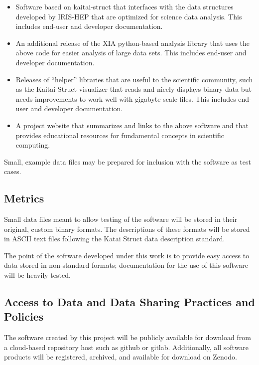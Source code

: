 \documentclass[11pt,oneside]{memoir}
\begin{document}
\begin{itemize}
    \item Software based on kaitai-struct that interfaces with the data structures developed by IRIS-HEP that are optimized for science data analysis.  This includes end-user and developer documentation.
    \item An additional release of the XIA python-based analysis library that uses the above code for easier analysis of large data sets.  This includes end-user and developer documentation.
    \item Releases of ``helper'' libraries that are useful to the scientific community, such as the Kaitai Struct visualizer that reads and nicely displays binary data but needs improvements to work well with gigabyte-scale files.  This includes end-user and developer documentation.
    \item A project website that summarizes and links to the above software and that provides educational resources for fundamental concepts in scientific computing.
\end{itemize}

Small, example data files may be prepared for inclusion with the software as test cases.

\subsection{Metrics}

Small data files meant to allow testing of the software will be stored in their original, custom binary formats.  The descriptions of these formats will be stored in ASCII text files following the Katai Struct data description standard.

The point of the software developed under this work is to provide easy access to data stored in non-standard formats; documentation for the use of this software will be heavily tested.

\subsection{Access to Data and Data Sharing Practices and Policies}
The software created by this project will be publicly available for download from a cloud-based repository host such as github or gitlab.  Additionally, all software products will be registered, archived, and available for download on Zenodo.
\end{document}
